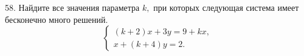 58. Найдите все значения параметра $k,$ при которых следующая система имеет бесконечно много решений.
$$\begin{cases}
(k+2)x+3y=9+kx,\\
x+(k+4)y=2.
\end{cases}
$$
